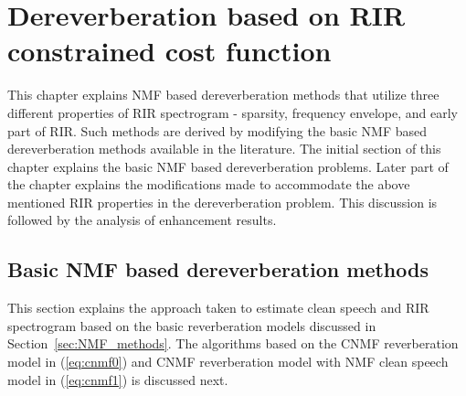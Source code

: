 

\chapter{Dereverberation based on RIR constrained cost function}
\label{chapter:icassp2017}

This chapter explains NMF based dereverberation methods that utilize three different properties of RIR spectrogram - sparsity, frequency envelope, and early part of RIR. Such methods are derived by modifying the basic NMF based dereverberation methods available in the literature. The initial section of this chapter explains the basic NMF based dereverberation problems. Later part of the chapter explains the modifications made to accommodate the above mentioned RIR properties in the dereverberation problem. This discussion is followed by the analysis of enhancement results. 

\section{Basic NMF based dereverberation methods}
\label{sec:basic_NMF_reverb_model}
This section explains the approach taken to estimate clean speech and RIR spectrogram based on the basic reverberation models discussed in Section~\ref{sec:NMF_methods}. The algorithms based on the CNMF reverberation model in (\ref{eq:cnmf0}) and CNMF reverberation model with NMF clean speech model in (\ref{eq:cnmf1}) is discussed next. 

